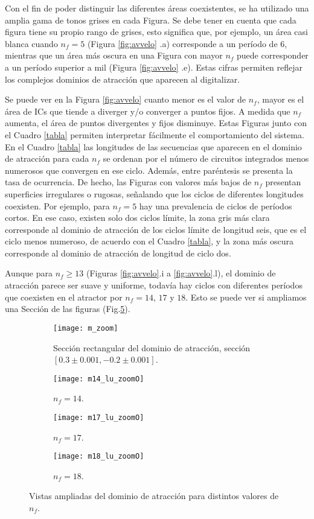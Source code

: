 Con el fin de poder distinguir las diferentes áreas coexistentes, se ha utilizado una amplia gama de tonos grises en cada Figura.
Se debe tener en cuenta que cada figura tiene su propio rango de grises, esto significa que, por ejemplo, un área casi blanca cuando $n_f = 5$ (Figura \ref{fig:avvelo} .a) corresponde a un período de $6$, mientras que un área más oscura en una Figura con mayor $n_f$ puede corresponder a un período superior a mil (Figura \ref{fig:avvelo} .e).
Estas cifras permiten reflejar los complejos dominios de atracción que aparecen al digitalizar.

Se puede ver en la Figura \ref{fig:avvelo} cuanto menor es el valor de $n_f$, mayor es el área de ICs que tiende a diverger y/o converger a puntos fijos.
A medida que $n_f$ aumenta, el área de puntos divergentes y fijos disminuye.
Estas Figuras junto con el Cuadro \ref{tabla} permiten interpretar fácilmente el comportamiento del sistema.
En el Cuadro \ref{tabla} las longitudes de las secuencias que aparecen en el dominio de atracción para cada $n_f$ se ordenan por el número de circuitos integrados menos numerosos que convergen en ese ciclo.
Además, entre paréntesis se presenta la tasa de ocurrencia.
De hecho, las Figuras con valores más bajos de $n_f$ presentan superficies irregulares o rugosas, señalando que los ciclos de diferentes longitudes coexisten.
Por ejemplo, para $n_f = 5$ hay una prevalencia de ciclos de períodos cortos.
En ese caso, existen solo dos ciclos límite, la zona gris más clara corresponde al dominio de atracción de los ciclos límite de longitud seis, que es el ciclo menos numeroso, de acuerdo con el Cuadro \ref{tabla}, y la zona más oscura corresponde al dominio de atracción de longitud de ciclo dos.

Aunque para $n_f \geqslant 13$ (Figuras \ref{fig:avvelo}.i a \ref{fig:avvelo}.l), el dominio de atracción parece ser suave y uniforme, todavía hay ciclos con diferentes períodos que coexisten en el atractor por $ n_f = 14 $, $ 17 $ y $ 18 $.
Esto se puede ver si ampliamos una Sección de las figuras (Fig.\ref{fig:m_zoom}).
%
\begin{figure}
	\centering
	\begin{subfigure}[t]{0.49\textwidth}
		\texttt{[image: m\_zoom]}
		\caption{Sección rectangular del dominio de atracción, sección $[0.3\pm 0.001, -0.2\pm 0.001]$.}
		\label{fig:gull}
	\end{subfigure}
	\hfill 
	\begin{subfigure}[t]{0.49\textwidth}
		\texttt{[image: m14\_lu\_zoomO]}
		\caption{$n_f=14$.}
		\label{fig:tiger}
	\end{subfigure}
	\hfill  
	\begin{subfigure}[t]{0.49\textwidth}
		\texttt{[image: m17\_lu\_zoomO]}
		\caption{$n_f=17$.}
		\label{fig:mouse}
	\end{subfigure}
	\hfill   
	\begin{subfigure}[t]{0.49\textwidth}
		\texttt{[image: m18\_lu\_zoomO]}
		\caption{$n_f=18$.}
		\label{fig:mouse}
	\end{subfigure}
	\caption{Vistas ampliadas del dominio de atracción para distintos valores de $n_f$.}\label{fig:m_zoom}
\end{figure}

